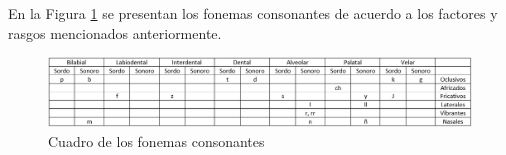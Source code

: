 En la Figura \ref{fig:fonemasConsonantes} se presentan los fonemas consonantes de acuerdo a los factores y rasgos mencionados anteriormente.

\begin{figure}[H]
	\centering
	\includegraphics[width=1\linewidth]{figures/fonemasConsonantes}
	\caption{Cuadro de los fonemas consonantes}
	\label{fig:fonemasConsonantes}
\end{figure}

